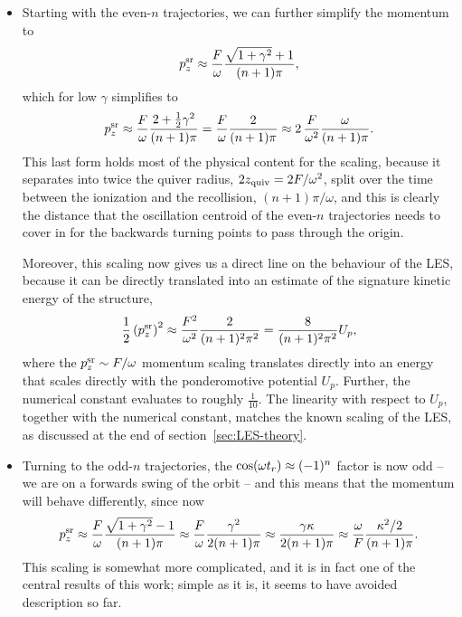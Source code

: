 \begin{itemize}

\item Starting with the even-$n$ trajectories, we can further simplify the momentum to 
\begin{equation}
p_z^{\mathrm{sr}} \approx \frac F\omega \frac{\sqrt{1+\gamma^2}+1}{(n+1)\pi},
\end{equation}
which for low $\gamma$ simplifies to
\begin{equation}
p_z^{\mathrm{sr}} 
\approx \frac F\omega \frac{2+\frac12 \gamma^2}{(n+1)\pi}
=\frac F\omega \frac{2}{(n+1)\pi}
\approx 2\,\frac{F}{\omega^2} \frac{\omega}{(n+1)\pi}.
\label{e6-even-n-scaling}
\end{equation}
This last form holds most of the physical content for the scaling, because it separates into twice the quiver radius, $2z_\mathrm{quiv}=2F/\omega^2$, split over the time between the ionization and the recollision, $(n+1)\pi/\omega$, and this is clearly the distance that the oscillation centroid of the even-$n$ trajectories needs to cover in  for the backwards turning points to pass through the origin.

Moreover, this scaling now gives us a direct line on the behaviour of the LES, because it can be directly translated into an estimate of the signature kinetic energy of the structure,
\begin{equation}
\frac12 \left(p_z^{\mathrm{sr}}\right)^2 
\approx \frac{F^2}{\omega^2}\frac{2}{(n+1)^2\pi^2}
=\frac{8}{(n+1)^2\pi^2} U_p,
\end{equation}
where the $p_z^{\mathrm{sr}}\sim F/\omega$ momentum scaling translates directly into an energy that scales directly with the ponderomotive potential $U_p$. Further, the numerical constant evaluates to roughly $\frac{1}{10}$. The linearity with respect to $U_p$, together with the numerical constant, matches the known scaling of the LES, as discussed at the end of section~\ref{sec:LES-theory}.

\item Turning to the odd-$n$ trajectories, the $\cos(\omega{t_r})\approx (-1)^n$ factor is now odd -- we are on a forwards swing of the orbit -- and this means that the momentum will behave differently, since now
\begin{equation}
p_z^{\mathrm{sr}} 
\approx \frac F\omega \frac{\sqrt{1+\gamma^2}-1}{(n+1)\pi}
\approx \frac F\omega \frac{\gamma^2}{2(n+1)\pi}
\approx \frac{\gamma\kappa}{2(n+1)\pi}
\approx \frac{\omega}{F} \frac{\kappa^2/2}{(n+1)\pi}.
\label{e6-pzsr-odd-n-full}
\end{equation}
This scaling is somewhat more complicated, and it is in fact one of the central results of this work; simple as it is, it seems to have avoided description so far.


\end{itemize}
